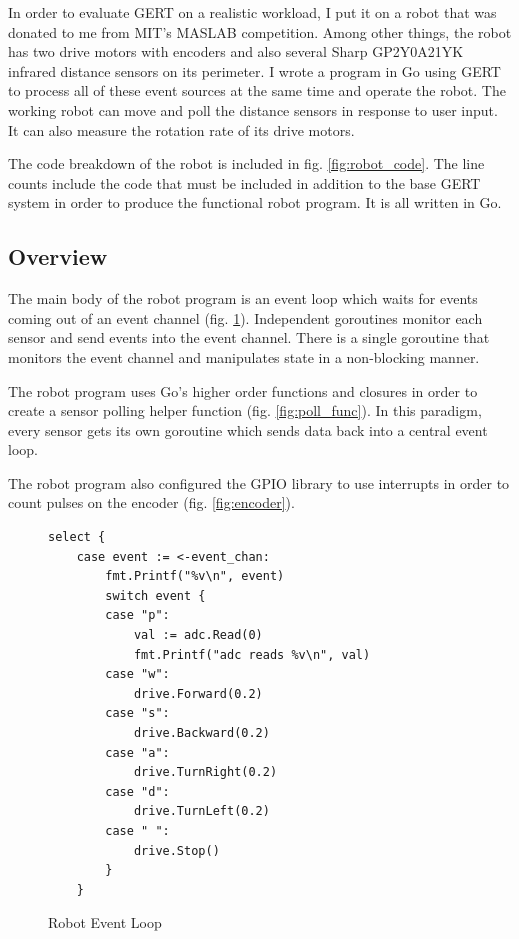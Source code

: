 In order to evaluate GERT on a realistic workload, I put it on a robot that was
donated to me from MIT's MASLAB competition. Among other things, the robot has two drive
motors with encoders and also several Sharp GP2Y0A21YK infrared distance sensors on its perimeter.
I wrote a program in Go using GERT to process all of these event sources at the same time
and operate the robot. The working robot can move and poll the distance sensors in response to user input.
It can also measure the rotation rate of its drive motors.

The code breakdown of the robot is included in fig. \ref{fig:robot_code}. The line counts include the code that must be
included in addition to the base GERT system in order to produce the functional robot program. It is all written
in Go.

\subsection{Overview}
The main body of the robot program is an event loop which waits for events coming out of an event channel (fig. \ref{fig:event_loop}).
Independent goroutines monitor each sensor and send events into the event channel. There is a
single goroutine that monitors the event channel and manipulates state in a non-blocking manner.

The robot program uses Go's higher order functions and closures in order to create a sensor polling helper function
(fig. \ref{fig:poll_func}). In this paradigm, every sensor gets its own goroutine which sends
data back into a central event loop.

The robot program also configured the GPIO library to use interrupts in order to count pulses on the encoder (fig. \ref{fig:encoder}).

\begin{figure}[!h]
  \begin{center}
\begin{lstlisting}
select {
	case event := <-event_chan:
		fmt.Printf("%v\n", event)
		switch event {
		case "p":
			val := adc.Read(0)
			fmt.Printf("adc reads %v\n", val)
		case "w":
			drive.Forward(0.2)
		case "s":
			drive.Backward(0.2)
		case "a":
			drive.TurnRight(0.2)
		case "d":
			drive.TurnLeft(0.2)
		case " ":
			drive.Stop()
		}
	}
\end{lstlisting}
\end{center}
  \caption{Robot Event Loop} \label{fig:event_loop}
\end{figure}


